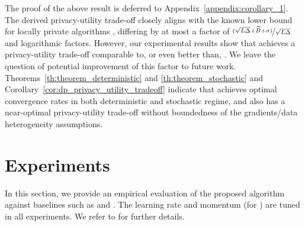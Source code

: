 \documentclass[a4paper,11pt]{article}
\begin{document}
The proof of the above result is deferred to Appendix~\ref{appendix:corollary_1}. The derived privacy-utility trade-off closely aligns with the known lower bound for locally private algorithms \citep{duchi2018minimax}, differing by at most a factor of $\nicefrac{(\sqrt{L\Delta} +  \widetilde{B} + \sigma)}{\sqrt{L\Delta}}$ and logarithmic factors. However, our experimental results show that  achieves a privacy-utility trade-off comparable to, or even better than, . We leave the question of potential improvement of this factor to future work. Theorems~\ref{th:theorem_deterministic} and \ref{th:theorem_stochastic} and Corollary~\ref{cor:dp_privacy_utility_tradeoff} indicate that  achieves optimal convergence rates in both deterministic and stochastic regime, and also has a near-optimal privacy-utility trade-off without boundedness of the gradients/data heterogeneity assumptions. 



\section{Experiments} 

In this section, we provide an empirical evaluation of the proposed algorithm against baselines such as  \citep{khirirat2023clip21} and . The learning rate and momentum (for ) are tuned in all experiments. We refer to  for further details.
\end{document}
